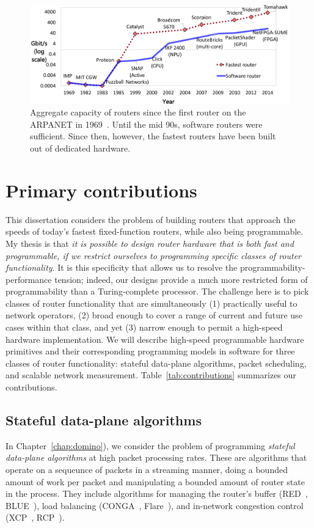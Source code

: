 \begin{figure}
\centering
\includegraphics[width=\columnwidth]{router_evolution.pdf}
\caption{Aggregate capacity of routers since the first router on the ARPANET in
1969~\cite{imp}. Until the mid 90s, software routers were sufficient. Since
then, however, the fastest routers have been built out of dedicated hardware.}
\label{fig:router_evolution}
\end{figure}

\section{Primary contributions}


This dissertation considers the problem of building routers that approach the
speeds of today's fastest fixed-function routers, while also being
programmable. My thesis is that {\em it is possible to design router hardware
that is both fast and programmable, if we restrict ourselves to programming
specific classes of router functionality}. It is this specificity that allows
us to resolve the programmability-performance tension; indeed, our designs
provide a much more restricted form of programmability than a Turing-complete
processor.  The challenge here is to pick classes of router functionality that
are simultaneously (1) practically useful to network operators, (2) broad
enough to cover a range of current and future use cases within that class, and
yet (3) narrow enough to permit a high-speed hardware implementation. We will
describe high-speed programmable hardware primitives and their corresponding
programming models in software for three classes of router functionality:
stateful data-plane algorithms, packet scheduling, and scalable network
measurement.  Table~\ref{tab:contributions} summarizes our contributions.

\subsection{Stateful data-plane algorithms}
In Chapter~\ref{chap:domino}), we consider the problem of programming {\em
stateful data-plane algorithms} at high packet processing rates. These are
algorithms that operate on a sequeunce of packets in a streaming manner, doing
a bounded amount of work per packet and manipulating a bounded amount of router
state in the process.  They include algorithms for managing the router's buffer
(\eg RED~\cite{red}, BLUE~\cite{blue}), load balancing (\eg CONGA~\cite{conga},
Flare~\cite{flare}), and in-network congestion control (\eg XCP~\cite{xcp},
RCP~\cite{rcp}).

